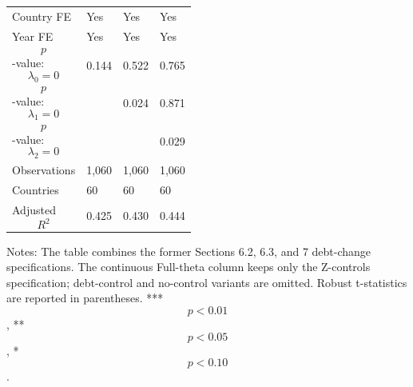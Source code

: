 \begin{table}[H]
\begin{threeparttable}
\begin{tabularx}{\textwidth}{lYYY}
Country FE & Yes & Yes & Yes \\
Year FE & Yes & Yes & Yes \\
$$p$$-value: $$\lambda_0=0$$ & 0.144 & 0.522 & 0.765 \\
$$p$$-value: $$\lambda_1=0$$ &  & 0.024 & 0.871 \\
$$p$$-value: $$\lambda_2=0$$ &  &  & 0.029 \\
Observations & 1,060 & 1,060 & 1,060 \\
Countries & 60 & 60 & 60 \\
Adjusted $$R^2$$ & 0.425 & 0.430 & 0.444 \\
\bottomrule
\end{tabularx}
\begin{tablenotes}[flushleft]\footnotesize
\item Notes: The table combines the former Sections 6.2, 6.3, and 7 debt-change specifications. The continuous Full-theta column keeps only the Z-controls specification; debt-control and no-control variants are omitted. Robust t-statistics are reported in parentheses. *** $$p<0.01$$, ** $$p<0.05$$, * $$p<0.10$$.
\end{tablenotes}
\end{threeparttable}
\end{table}
